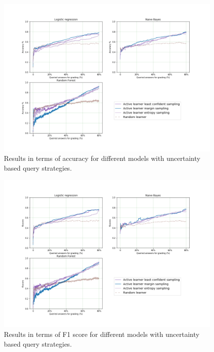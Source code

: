 \begin{figure}[!htb]
 	\centering
 	\includegraphics[scale=0.45]{images/task2_accuracy_uncertainty}
 	\caption{Results in terms of accuracy for different models with uncertainty based query strategies.}
 	\label{t2_m_uncertainty}
 \end{figure}
 
 \begin{figure}[!htb]
 	\centering
 	\includegraphics[scale=0.45]{images/task2_f1score_uncertainty}
 	\caption{Results in terms of F1 score for different models with uncertainty based query strategies.}
 	\label{t2_m_uncertainty_f1}
 \end{figure}
 
